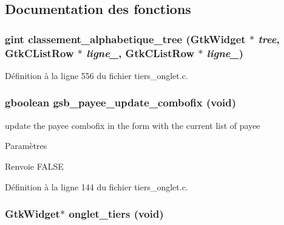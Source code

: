 \subsection{Documentation des fonctions}
\subsubsection[{classement\_\-alphabetique\_\-tree}]{\setlength{\rightskip}{0pt plus 5cm}gint classement\_\-alphabetique\_\-tree (GtkWidget $\ast$ {\em tree}, \/  GtkCListRow $\ast$ {\em ligne\_}, \/  GtkCListRow $\ast$ {\em ligne\_})}\label{tiers__onglet_8c_a220dbddbe43e20dae2754060704816fe}


Définition à la ligne 556 du fichier tiers\_\-onglet.c.

\subsubsection[{gsb\_\-payee\_\-update\_\-combofix}]{\setlength{\rightskip}{0pt plus 5cm}gboolean gsb\_\-payee\_\-update\_\-combofix (void)}\label{tiers__onglet_8c_a83502a3974423bccf9982335c494e683}
update the payee combofix in the form with the current list of payee


\begin{DoxyParams}{Paramètres}
\item[{\em }]\end{DoxyParams}
\begin{DoxyReturn}{Renvoie}
FALSE 
\end{DoxyReturn}


Définition à la ligne 144 du fichier tiers\_\-onglet.c.

\subsubsection[{onglet\_\-tiers}]{\setlength{\rightskip}{0pt plus 5cm}GtkWidget$\ast$ onglet\_\-tiers (void)}\label{tiers__onglet_8c_accd2776091bc5768c5d272ea591eb393}


